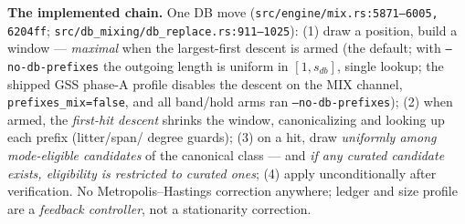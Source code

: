 \documentclass[11pt]{article}
\newcommand{\code}[1]{\texttt{#1}}
\begin{document}
\textbf{The implemented chain.} One DB move (\code{src/engine/mix.rs:5871--6005, 6204ff};
\code{src/db\_mixing/db\_replace.rs:911--1025}): (1) draw a position, build a window --- \emph{maximal} when the largest-first descent is armed (the
default; with \code{--no-db-prefixes} the outgoing length is uniform in $[1,s_{db}]$, single lookup;
the shipped GSS phase-A profile disables the descent on the MIX channel, \code{prefixes\_mix=false},
and all band/hold arms ran \code{--no-db-prefixes}); (2) when armed, the
\emph{first-hit descent} shrinks the window, canonicalizing and looking up each prefix (litter/span/
degree guards); (3) on a hit, draw \emph{uniformly among mode-eligible candidates} of the canonical
class --- and \emph{if any curated candidate exists, eligibility is restricted to curated ones}; (4)
apply unconditionally after verification. No Metropolis--Hastings correction anywhere; ledger and
size profile are a \emph{feedback controller}, not a stationarity correction.
\end{document}
